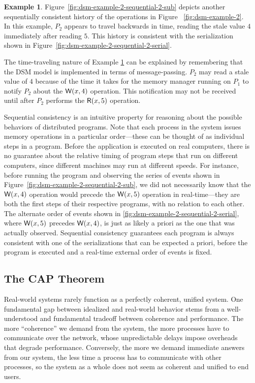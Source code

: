 \documentclass[]             %
{NASA}                       %
\theoremstyle{definition}
\newtheorem{example}[theorem]{Example}
\begin{document}
\begin{example}
  \label{ex:dsm-example-2-sequential-2}
  Figure~\ref{fig:dsm-example-2-sequential-2-sub} depicts another
  sequentially consistent history of the operations in Figure
 ~\ref{fig:dsm-example-2}. In this example, $P_2$ appears to travel
  backwards in time, reading the stale value $4$ immediately after
  reading $5$. This history is consistent with the serialization
  shown in Figure~\ref{fig:dsm-example-2-sequential-2-serial}.
\end{example}

The time-traveling nature of Example
\ref{ex:dsm-example-2-sequential-2} can be explained by remembering
that the DSM model is implemented in terms of message-passing. $P_2$
may read a stale value of $4$ because of the time it takes for the
memory manager running on $P_1$ to notify $P_2$ about the
$\mathsf{W}\!\left(x, 4\right)$ operation. This notification may not be received
until after $P_2$ performs the $\mathsf{R}\!\left(x, 5\right)$ operation.

Sequential consistency is an intuitive property for reasoning about
the possible behaviors of distributed programs. Note that each process
in the system issues memory operations in a particular order---these
can be thought of as individual steps in a program. Before the
application is executed on real computers, there is no guarantee about
the relative timing of program steps that run on different computers,
since different machines may run at different speeds. For instance,
before running the program and observing the series of events shown in
Figure~\ref{fig:dsm-example-2-sequential-2-sub}, we did not
necessarily know that the $\mathsf{W}\!\left(x, 4\right)$ operation would precede
the $\mathsf{W}\!\left(x, 5\right)$ operation in real-time---they are both the first
steps of their respective programs, with no relation to each
other. The alternate order of events shown in
\ref{fig:dsm-example-2-sequential-2-serial}, where $\mathsf{W}\!\left(x, 5\right)$
precedes $\mathsf{W}\!\left(x, 4\right)$, is just as likely a priori as the one that
was actually observed. Sequential consistency guarantees each program
is always consistent with one of the serializations that can be
expected a priori, before the program is executed and a real-time
external order of events is fixed.

\subsection{The CAP Theorem}
Real-world systems rarely function as a perfectly coherent, unified
system. One fundamental gap between idealized and real-world behavior
stems from a well-understood and fundamental tradeoff between
coherence and performance. The more ``coherence'' we demand from the
system, the more processes have to communicate over the network, whose
unpredictable delays impose overheads that degrade
performance. Conversely, the more we demand immediate answers from our
system, the less time a process has to communicate with other
processes, so the system as a whole does not seem as coherent and
unified to end users.
\end{document}
